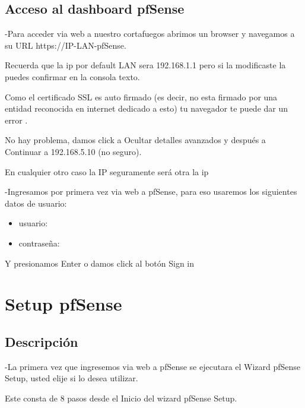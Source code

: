 \documentclass[12pt,letterspaper]{report}
\begin{document}
\chapter*{Acceso al dashboard pfSense}
\vspace {0.1cm}
-Para acceder via web a nuestro cortafuegos abrimos un browser y navegamos a su URL https://IP-LAN-pfSense.\par
\vspace {0.3cm}
Recuerda que la ip por default LAN sera 192.168.1.1 pero si la modificaste la puedes confirmar en la consola texto.\par
\vspace {0.3cm}
Como el certificado SSL es auto firmado (es decir, no esta firmado por una entidad reconocida en internet dedicado a esto) tu navegador te puede dar un error .\par
\vspace {0.3cm}
No hay problema, damos click a Ocultar detalles avanzados y después a Continuar a 192.168.5.10 (no seguro).\par
\vspace {0.3cm}
En cualquier otro caso la IP seguramente será otra la ip\par
\vspace {0.3cm}
-Ingresamos por primera vez via web a pfSense, para eso usaremos los siguientes datos de usuario:\par
\vspace {0.3cm}
\begin{itemize}
\item usuario: \par
\item contraseña: \par
\end{itemize}
\vspace {0.3cm}
Y presionamos Enter o damos click al botón Sign in\par
\vspace {0.3cm}

\part{Setup pfSense}
\chapter*{Descripción}
\vspace {0.1cm}

-La primera vez que ingresemos via web a pfSense se ejecutara el Wizard pfSense Setup, usted elije si lo desea utilizar.\par
\vspace {0.3cm}
Este consta de 8 pasos desde el Inicio del wizard pfSense Setup.\par 
\vspace {0.3cm}
\end{document}
